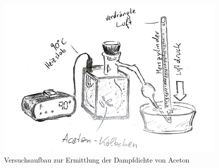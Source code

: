 \documentclass[12pt,a4paper]{article}
\begin{document}
\begin{figure}[H]
	\centering
	\includegraphics[scale=0.4]{./figure/dampfdruck.png}
	\caption{Versuchsaufbau zur Ermittlung der Dampfdichte von Aceton}
	\label{fig:dampfdruck_aufbau}
\end{figure}
\end{document}
